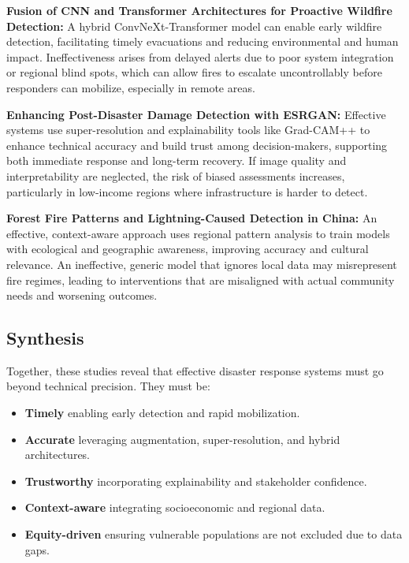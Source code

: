 \documentclass[conference,a4paper]{IEEEtran}
\begin{document}
\textbf{Fusion of CNN and Transformer Architectures for Proactive Wildfire Detection:}
A hybrid ConvNeXt-Transformer model can enable early wildfire detection, facilitating timely evacuations and reducing environmental and human impact. Ineffectiveness arises from delayed alerts due to poor system integration or regional blind spots, which can allow fires to escalate uncontrollably before responders can mobilize, especially in remote areas.

\textbf{Enhancing Post-Disaster Damage Detection with ESRGAN:}
Effective systems use super-resolution and explainability tools like Grad-CAM++ to enhance technical accuracy and build trust among decision-makers, supporting both immediate response and long-term recovery. If image quality and interpretability are neglected, the risk of biased assessments increases, particularly in low-income regions where infrastructure is harder to detect.

\textbf{Forest Fire Patterns and Lightning-Caused Detection in China:}
An effective, context-aware approach uses regional pattern analysis to train models with ecological and geographic awareness, improving accuracy and cultural relevance. An ineffective, generic model that ignores local data may misrepresent fire regimes, leading to interventions that are misaligned with actual community needs and worsening outcomes.

\subsection{Synthesis}

Together, these studies reveal that effective disaster response systems must go beyond technical precision. They must be:

\begin{itemize}
    \item \textbf{Timely} enabling early detection and rapid mobilization.
    \item \textbf{Accurate} leveraging augmentation, super-resolution, and hybrid architectures.
    \item \textbf{Trustworthy} incorporating explainability and stakeholder confidence.
    \item \textbf{Context-aware} integrating socioeconomic and regional data.
    \item \textbf{Equity-driven} ensuring vulnerable populations are not excluded due to data gaps.
\end{itemize}
\end{document}

